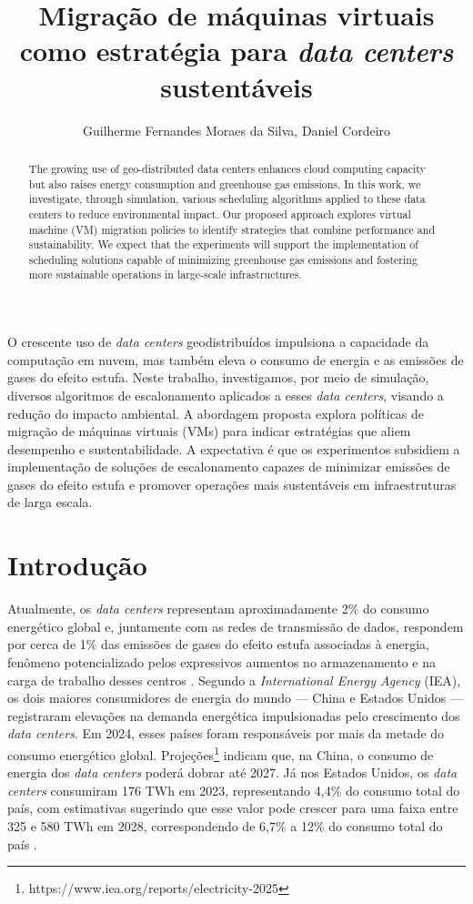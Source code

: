 \documentclass[12pt]{article}
\title{Migração de máquinas virtuais como estratégia para \textit{data centers} sustentáveis}
\author{Guilherme Fernandes Moraes da Silva\inst{1}, Daniel Cordeiro\inst{1}}
\begin{document}
 

\maketitle

\begin{abstract}
The growing use of geo-distributed data centers enhances cloud computing capacity but also raises energy consumption and greenhouse gas emissions. In this work, we investigate, through simulation, various scheduling algorithms applied to these data centers to reduce environmental impact. Our proposed approach explores virtual machine (VM) migration policies to identify strategies that combine performance and sustainability. We expect that the experiments will support the implementation of scheduling solutions capable of minimizing greenhouse gas emissions and fostering more sustainable operations in large-scale infrastructures.
\end{abstract}
     
\begin{resumo}
O crescente uso de \textit{data centers} geodistribuídos impulsiona a capacidade da computação em nuvem, mas também eleva o consumo de energia e as emissões de gases do efeito estufa. Neste trabalho, investigamos, por meio de simulação, diversos algoritmos de escalonamento aplicados a esses \textit{data centers}, visando a redução do impacto ambiental. A abordagem proposta explora políticas de migração de máquinas virtuais (VMs) para indicar estratégias que aliem desempenho e sustentabilidade. A expectativa é que os experimentos subsidiem a implementação de soluções de escalonamento capazes de minimizar emissões de gases do efeito estufa e promover operações mais sustentáveis em infraestruturas de larga escala.
\end{resumo}


\section{Introdução}
Atualmente, os \textit{data centers} representam aproximadamente 2\% do consumo energético global e, juntamente com as redes de transmissão de dados, respondem por cerca de 1\% das emissões de gases do efeito estufa associadas à energia, fenômeno potencializado pelos expressivos aumentos no armazenamento e na carga de trabalho desses centros \cite{masanet:20}. Segundo a \textit{International Energy Agency} (IEA), os dois maiores consumidores de energia do mundo --- China e Estados Unidos --- registraram elevações na demanda energética impulsionadas pelo crescimento dos \textit{data centers}. Em 2024, esses países foram responsáveis por mais da metade do consumo energético global. Projeções\footnote{https://www.iea.org/reports/electricity-2025} indicam que, na China, o consumo de energia dos \textit{data centers} poderá dobrar até 2027. Já nos Estados Unidos, os \textit{data centers} consumiram 176 TWh em 2023, representando 4,4\% do consumo total do país, com estimativas sugerindo que esse valor pode crescer para uma faixa entre 325 e 580 TWh em 2028, correspondendo de 6,7\% a 12\% do consumo total do país \cite{shehabi:24}.
\end{document}
